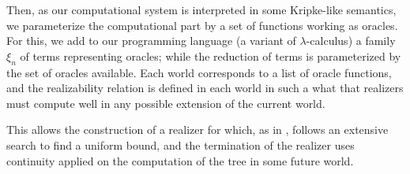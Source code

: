 \documentclass{easychair}
\begin{document}
Then, as our computational system is interpreted in some Kripke-like semantics, we parameterize the computational part by a set of functions working as oracles. For this, we add to our programming language (a variant of $\lambda$-calculus) a family $\xi_n$ of terms representing oracles; while the reduction of terms is parameterized by the set of oracles available. Each world corresponds to a list of oracle functions, and the realizability relation is defined in each world in such a what that realizers must compute well in any possible extension of the current world.

This allows the construction of a realizer for \FT which, as in \cite{LubRat13}, follows an extensive search to find a uniform bound, and the termination of the realizer uses continuity applied on the computation of the tree in some future world.
\end{document}
